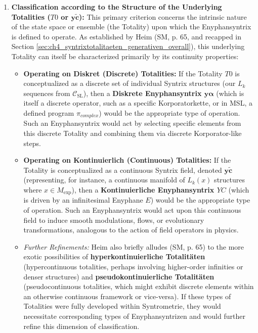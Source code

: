 \documentclass[
    12pt,              %
    a4paper,           %
    headings=normal,   %
    twoside=true,      %
    BCOR=8mm,          %
]{scrbook}
\newcommand{\syntrixtotalitaet}{T0}
\newcommand{\diskreteEnyphansyntrix}{\bm{y\alpha}}
\newcommand{\kontinuierlicheEnyphansyntrix}{YC}
\newcommand{\enyphane}{E}
\newcommand{\Mexp}{M_{\text{exp}}}
\begin{document}
\begin{enumerate}[label=(\arabic*)]
    \item  \textbf{Classification according to the Structure of the Underlying Totalities (\(\syntrixtotalitaet\) or \(\bm{y\widetilde{c}}\)):}
        This primary criterion concerns the intrinsic nature of the state space or ensemble (the Totality) upon which the Enyphansyntrix is defined to operate. As established by Heim (SM, p. 65, and recapped in Section \ref{sec:ch4_syntrixtotalitaeten_generativen_overall}), this underlying Totality can itself be characterized primarily by its continuity properties:
        \begin{itemize}
            \item   \textbf{Operating on Diskret (Discrete) Totalities:} If the Totality \(\syntrixtotalitaet\) is conceptualized as a discrete set of individual Syntrix structures (our \(L_k\) sequences from \(\mathcal{C}_{\text{SL}}\)), then a \textbf{Diskrete Enyphansyntrix \(\diskreteEnyphansyntrix\)} (which is itself a discrete operator, such as a specific Korporatorkette, or in MSL, a defined program \(\pi_{complex}\)) would be the appropriate type of operation. Such an Enyphansyntrix would act by selecting specific elements from this discrete Totality and combining them via discrete Korporator-like steps.
            \item   \textbf{Operating on Kontinuierlich (Continuous) Totalities:} If the Totality is conceptualized as a continuous Syntrix field, denoted \(\bm{y\widetilde{c}}\) (representing, for instance, a continuous manifold of \(L_k(x)\) structures where \(x \in \Mexp\)), then a \textbf{Kontinuierliche Enyphansyntrix \(\kontinuierlicheEnyphansyntrix\)} (which is driven by an infinitesimal Enyphane \(\enyphane\)) would be the appropriate type of operation. Such an Enyphansyntrix would act upon this continuous field to induce smooth modulations, flows, or evolutionary transformations, analogous to the action of field operators in physics.
            \item   \textit{Further Refinements:} Heim also briefly alludes (SM, p. 65) to the more exotic possibilities of \textbf{hyperkontinuierliche Totalitäten} (hypercontinuous totalities, perhaps involving higher-order infinities or denser structures) and \textbf{pseudokontinuierliche Totalitäten} (pseudocontinuous totalities, which might exhibit discrete elements within an otherwise continuous framework or vice-versa). If these types of Totalities were fully developed within Syntrometrie, they would necessitate corresponding types of Enyphansyntrizen and would further refine this dimension of classification.
        \end{itemize}


\end{enumerate}
\end{document}
